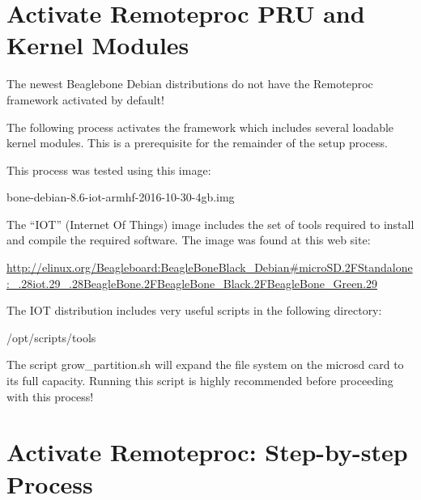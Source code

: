 \section{Activate Remoteproc PRU and Kernel Modules}

The newest Beaglebone Debian distributions do not have the Remoteproc framework activated by default!

The following process activates the framework which includes several loadable kernel modules.  This is a prerequisite for the remainder of the setup process.

This process was tested using this image:

bone-debian-8.6-iot-armhf-2016-10-30-4gb.img

The ``IOT'' (Internet Of Things) image includes the set of tools required to install and compile the required software.
The image was found at this web site:

\url{http://elinux.org/Beagleboard:BeagleBoneBlack_Debian#microSD.2FStandalone:_.28iot.29_.28BeagleBone.2FBeagleBone_Black.2FBeagleBone_Green.29}

The IOT distribution includes very useful scripts in the following directory:

/opt/scripts/tools

The script grow\_partition.sh will expand the file system on the microsd card to its full capacity.  Running this script is highly recommended before proceeding with this process!

\section{Activate Remoteproc: Step-by-step Process}

